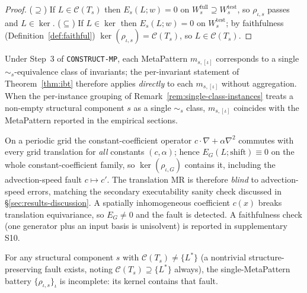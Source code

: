 \begin{proof}
($\supseteq$) If $L\in\mathcal{C}(T_s)$ then $E_s(L;w)=0$ on $W^{\mathrm{full}}_s\supseteq
W^{\mathrm{test}}_s$, so $\rho_{\iota,s}$ passes and $L\in\ker$.
($\subseteq$) If $L\in\ker$ then $E_s(L;w)=0$ on $W^{\mathrm{test}}_s$; by faithfulness
(Definition~\ref{def:faithful}) $\ker(\rho_{\iota,s})=\mathcal{C}(T_s)$, so
$L\in\mathcal{C}(T_s)$.
\end{proof}

\begin{remark}
\label{rem:ibt-mp}
Under Step~3 of \texttt{CONSTRUCT-MP}, each MetaPattern $m_{s,[\iota]}$ corresponds
to a single $\sim_s$-equivalence class of invariants; the per-invariant statement
of Theorem~\ref{thm:ibt} therefore applies \emph{directly} to each $m_{s,[\iota]}$
without aggregation. When the per-instance grouping of
Remark~\ref{rem:single-class-instances} treats a non-empty structural component $s$ as a single
$\sim_s$ class, $m_{s,[\iota]}$ coincides with the MetaPattern reported
in the empirical sections.
\end{remark}

\begin{remark}
\label{rem:ibt-advdiff}
On a periodic grid the constant-coefficient operator $c\cdot\nabla+\alpha\nabla^2$
commutes with every grid translation for \emph{all} constants $(c,\alpha)$; hence
$E_G(L;\text{shift})\equiv 0$ on the whole constant-coefficient family, so
$\ker(\rho_{\iota,G})$ contains it, including the advection-speed fault $c\mapsto c'$.
The translation MR is therefore \emph{blind} to advection-speed errors, matching
the secondary executability sanity check discussed in
\S\ref{sec:results-discussion}.
A spatially inhomogeneous coefficient $c(x)$ breaks translation equivariance, so
$E_G\neq 0$ and the fault is detected. A faithfulness check (one generator plus an
input basis is unisolvent) is reported in supplementary S10.
\end{remark}

\begin{corollary*}
For any structural component $s$ with $\mathcal{C}(T_s)\neq\{L^{*}\}$ (a nontrivial structure-
preserving fault exists, noting $\mathcal{C}(T_s)\supseteq\{L^{*}\}$ always), the
single-MetaPattern battery $\{\rho_{\iota,s}\}_\iota$ is
incomplete: its kernel contains that fault.
\end{corollary*}

